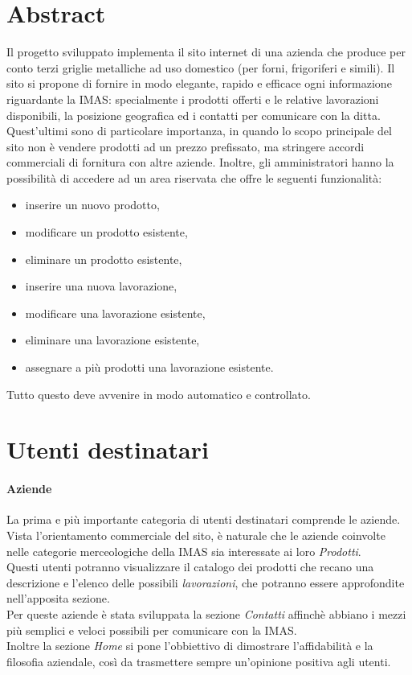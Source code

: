 \documentclass[11pt]{article}
\begin{document}
\section{Abstract}

Il progetto sviluppato implementa il sito internet di una azienda che produce per conto terzi griglie metalliche ad uso domestico (per forni, frigoriferi e simili).
Il sito si propone di fornire in modo elegante, rapido e efficace ogni informazione riguardante la IMAS: specialmente i prodotti offerti e le relative lavorazioni disponibili, la posizione geografica ed i contatti per comunicare con la ditta.
Quest'ultimi sono di particolare importanza, in quando lo scopo principale del sito non è vendere prodotti ad un prezzo prefissato, ma stringere accordi commerciali di fornitura con altre aziende.
Inoltre, gli amministratori hanno la possibilità di accedere ad un area riservata che offre le seguenti funzionalità:
\begin{itemize}
	\item inserire un nuovo prodotto,
	\item modificare un prodotto esistente,
	\item eliminare un prodotto esistente,
	\item inserire una nuova lavorazione,
	\item modificare una lavorazione esistente,
	\item eliminare una lavorazione esistente,
	\item assegnare a più prodotti una lavorazione esistente.
\end{itemize}
Tutto questo deve avvenire in modo automatico e controllato.
 
\newpage
\section{Utenti destinatari}

\paragraph{Aziende}
La prima e più importante categoria di utenti destinatari comprende le aziende.
Vista l'orientamento commerciale del sito, è naturale che le aziende coinvolte nelle categorie merceologiche della IMAS sia interessate ai loro \textit{Prodotti}.\\
Questi utenti potranno visualizzare il catalogo dei prodotti che recano una descrizione e l'elenco delle possibili \textit{lavorazioni}, che potranno essere approfondite nell'apposita sezione.\\
Per queste aziende è stata sviluppata la sezione \textit{Contatti} affinchè abbiano i mezzi più semplici e veloci possibili per comunicare con la IMAS.\\
Inoltre la sezione \textit{Home} si pone l'obbiettivo di dimostrare l'affidabilità e la filosofia aziendale, così da trasmettere sempre un'opinione positiva agli utenti.
\end{document}
